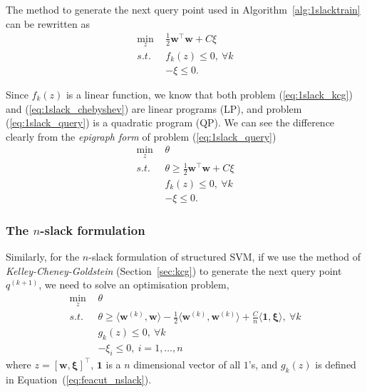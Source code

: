 The method to generate the next query point used in Algorithm~\ref{alg:1slacktrain} can be rewritten as
\begin{equation}
\label{eq:1slack_query}
\begin{aligned}
\min_{z} ~& \frac{1}{2} \mathbf{w}^\top \mathbf{w} + C \xi \\
s.t.~~ ~& f_k(z) \le 0,~ \forall k \\
        & -\xi \le 0.
\end{aligned}
\end{equation}


Since $f_k(z)$ is a linear function, we know that both problem (\ref{eq:1slack_kcg}) and (\ref{eq:1slack_chebyshev}) are linear programs (LP),
and problem (\ref{eq:1slack_query}) is a quadratic program (QP). 
We can see the difference clearly from the \emph{epigraph form} of problem (\ref{eq:1slack_query}) 
\begin{align*}
\min_{z} ~& \theta \\
s.t.~~ ~& \theta \ge \frac{1}{2} \mathbf{w}^\top \mathbf{w} + C \xi \\
        & f_k(z) \le 0,~ \forall k \\
        & -\xi \le 0.
\end{align*}


\subsubsection{The $n$-slack formulation}
\label{sec:compare_nslack}

Similarly, for the $n$-slack formulation of structured SVM,
if we use the method of \emph{Kelley-Cheney-Goldstein} (Section~\ref{sec:kcg}) to generate the next query point $q^{(k+1)}$,
we need to solve an optimisation problem,
\begin{equation}
\label{eq:nslack_kcg}
\begin{aligned}
\min_{z} ~& \theta \\
s.t.~~ ~& \theta \ge \langle \mathbf{w}^{(k)}, \mathbf{w} \rangle - \frac{1}{2} \langle \mathbf{w}^{(k)}, \mathbf{w}^{(k)} \rangle + 
\frac{C}{n} \langle \mathbf{1}, \bm{\xi} \rangle,~ \forall k \\
        & g_k(z) \le 0,~ \forall k \\
        & -\xi_i \le 0,~ i = 1, \dots, n
\end{aligned}
\end{equation}
where $z = [\mathbf{w}, \bm{\xi}]^\top$, $\mathbf{1}$ is a $n$ dimensional vector of all $1$'s,
and $g_k(z)$ is defined in Equation~(\ref{eq:feacut_nslack}).



